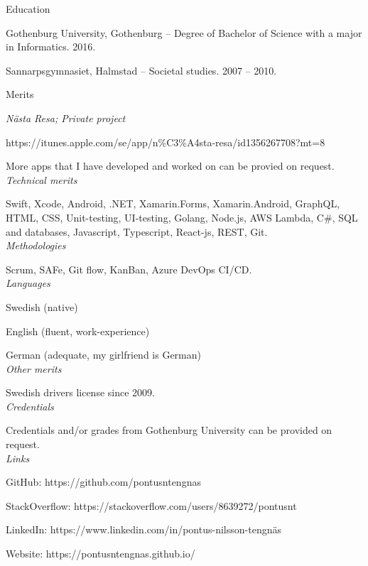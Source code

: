 \vspace{12px}

{\itshape\Large\begin{center}
Education
\end{center}}
  
\vspace{12px}

Gothenburg University, Gothenburg – Degree of Bachelor of Science with a major in Informatics. 2016.

Sannarpsgymnasiet, Halmstad – Societal studies. 2007 – 2010.

\newpage

{\itshape\Large\begin{center}
Merits
\end{center}}
  
\vspace{12px}

{\itshape Nästa Resa; Private project}

https://itunes.apple.com/se/app/n\%C3\%A4sta-resa/id1356267708?mt=8

More apps that I have developed and worked on can be provied on request.\\

{\itshape Technical merits}

Swift, Xcode, Android, .NET, Xamarin.Forms, Xamarin.Android, GraphQL, HTML,
CSS, Unit-testing, UI-testing, Golang, Node.js, AWS Lambda, C\#,
SQL and databases, Javascript, Typescript, React-js, REST, Git.\\

{\itshape Methodologies}

Scrum, SAFe, Git flow, KanBan, Azure DevOps CI/CD.\\

{\itshape Languages}

Swedish (native)

English (fluent, work-experience)

German (adequate, my girlfriend is German)\\

{\itshape Other merits}

Swedish drivers license since 2009.\\

{\itshape Credentials}

Credentials and/or grades from Gothenburg University can be provided on request.\\

{\itshape Links}

GitHub: https://github.com/pontusntengnas

StackOverflow: https://stackoverflow.com/users/8639272/pontusnt

LinkedIn: https://www.linkedin.com/in/pontus-nilsson-tengnäs

Website: https://pontusntengnas.github.io/